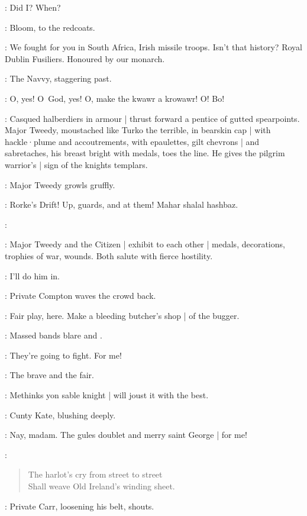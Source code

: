 \Stephen:
Did I?
When?

:
Bloom,
to the redcoats.

\Bloom:
We fought for you in South Africa,
Irish missile troops.
Isn't that history?
Royal Dublin Fusiliers.
Honoured by our monarch.

:
The Navvy,
staggering past.

\Navvy:
O,
yes!
O~God,
yes!
O,
make the kwawr a krowawr!
O!
Bo!%

:
Casqued halberdiers in armour |
thrust forward a pentice of gutted spearpoints.
Major Tweedy,
moustached like Turko the terrible,
in bearskin cap |
with hackle·plume and accoutrements,
with epaulettes,
gilt chevrons |
and sabretaches,
his breast bright with medals,
toes the line.
He gives the pilgrim warrior's |
sign of the knights templars.

:
Major Tweedy growls gruffly.

\MajorTweedy:
Rorke's Drift!
Up,
guards,
and at them!
Mahar shalal hashbaz.

\Citizen[7b]:

:
Major Tweedy and the Citizen |
exhibit to each other |
medals,
decorations,
trophies of war,
wounds.
Both salute with fierce hostility.

\Carr[7b]:
I'll do him in.

:
Private Compton waves the crowd back.

\Compton:
Fair play,
here.
Make a bleeding butcher's shop |
of the bugger.

:
Massed bands blare  and .%

\Cissy[7b]:
They're going to fight.
For me!

\CuntyKate[7a]:
The brave and the fair.

\BiddyClap[7a]:
Methinks yon sable knight |
will joust it with the best.

:
Cunty Kate,
blushing deeply.

\CuntyKate:
Nay,
madam.
The gules doublet and merry saint George |
for me!

\Stephen:
\begin{verse}
    The harlot's cry from street to street\\
    Shall weave Old Ireland's winding sheet.
\end{verse}

:
Private Carr,
loosening his belt,
shouts.

